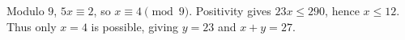 Modulo $9$, $5x\equiv2$, so $x\equiv4\pmod9$. Positivity gives $23x\le290$, hence $x\le12$. Thus only $x=4$ is possible, giving $y=23$ and $\boxed{x+y=27}$.
